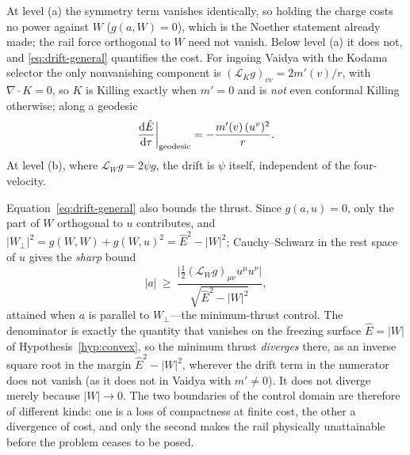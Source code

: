 \documentclass[12pt]{iopart}
\newcommand{\Ehat}{\hat E}
\newcommand{\dd}{\mathrm{d}}
\theoremstyle{plain}
\theoremstyle{definition}
\theoremstyle{plain}
\theoremstyle{remark}
\begin{document}
At level (a) the symmetry term vanishes identically, so holding the charge costs no power
against $W$ ($g(a,W)=0$), which is the Noether statement already made; the rail force
orthogonal to $W$ need not vanish. Below level (a) it does not, and
\eqref{eq:drift-general} quantifies the cost. For ingoing Vaidya with the Kodama
selector the only nonvanishing component is $(\mathcal L_Kg)_{vv}=2m'(v)/r$, with
$\nabla\!\cdot\!K=0$, so $K$ is Killing exactly when $m'=0$ and is \emph{not} even
conformal Killing otherwise; along a geodesic
\begin{equation}
    \frac{\dd\Ehat}{\dd\tau}\bigg|_{\rm geodesic}=-\frac{m'(v)\,(u^v)^2}{r} .
    \label{eq:vaidya-drift}
\end{equation}
At level (b), where $\mathcal L_Wg=2\psi g$, the drift is $\psi$ itself,
independent of the four-velocity.

Equation~\eqref{eq:drift-general} also bounds the thrust. Since $g(a,u)=0$, only
the part of $W$ orthogonal to $u$ contributes, and
$|W_\perp|^2=g(W,W)+g(W,u)^2=\Ehat^2-|W|^2$; Cauchy--Schwarz in the rest space of
$u$ gives the \emph{sharp} bound
\begin{equation}
    |a|\ \ge\ \frac{\big|\tfrac12(\mathcal L_Wg)_{\mu\nu}u^\mu u^\nu\big|}
                   {\sqrt{\Ehat^2-|W|^2}},
    \label{eq:thrust-general}
\end{equation}
attained when $a$ is parallel to $W_\perp$---the minimum-thrust control. The
denominator is exactly the quantity that vanishes on the freezing surface
$\Ehat=|W|$ of Hypothesis~\ref{hyp:convex}, so the minimum thrust \emph{diverges}
there, as an inverse square root in the margin $\Ehat^2-|W|^2$, wherever the drift term in
the numerator does not vanish (as it does not in Vaidya with $m'\neq0$). It does not
diverge merely because $|W|\to0$. The two boundaries of the control domain are
therefore of different kinds: one is a loss of compactness at finite cost, the
other a divergence of cost, and only the second makes the rail physically
unattainable before the problem ceases to be posed.
\end{document}
